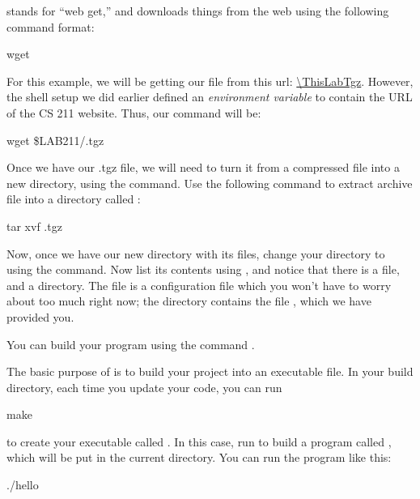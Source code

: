 \documentclass{tufte-handout}
\begin{document}
 stands for ``web get,'' and downloads things from the web using the
following command format:

\begin{CmdLine}
  \prompt wget 
\end{CmdLine}

\noindent
For this example, we will be getting our file from this url:
\url{\ThisLabTgz}. However, the shell setup we did earlier defined
an \emph{environment variable} to contain the URL of the CS 211
website. Thus, our command will be:

\begin{CmdLine}
  \prompt wget \$LAB211/\ThisLabBase.tgz
\end{CmdLine}

Once we have our .tgz file, we will need to turn it from a compressed
file into a new directory, using the  command. Use the
following command to extract archive file into a directory called
\filename{\ThisLabBase}:

\begin{CmdLine}
  \prompt tar xvf \ThisLabBase.tgz
\end{CmdLine}

Now, once we have our new directory with its files, change your
directory to \filename{\ThisLabBase} using the  command.
Now list its contents using , and notice that there is a
 file, and a  directory. The
 file is a  configuration file which
you won't have to worry about too much right now; the 
directory contains the file , which we have provided
you.

You can build your program using the command .

The basic purpose of  is to build your project into an
executable file. In your build directory, each time you update your
code, you can run

\begin{CmdLine}
  \prompt make 
\end{CmdLine}

\noindent to create your executable called .  In
this case, run  to build a program called
, which will be put in the current directory. You can
run the program like this:

\begin{CmdLine}
  \prompt ./hello
\end{CmdLine}
\end{document}
